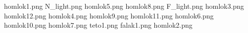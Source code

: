 homlok1.png
N_light.png
homlok5.png
homlok8.png
F_light.png
homlok3.png
homlok12.png
homlok4.png
homlok9.png
homlok11.png
homlok6.png
homlok10.png
homlok7.png
teto1.png
falak1.png
homlok2.png

